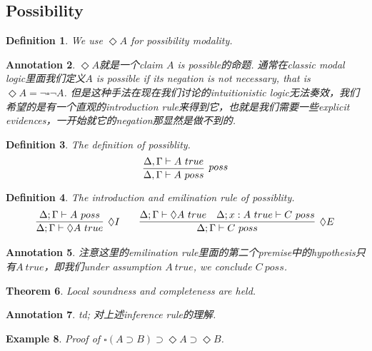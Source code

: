 \documentclass{article}
\theoremstyle{plain}
\newtheorem{theorem}{Theorem}
\newtheorem{example}[theorem]{Example}
\newtheorem{definition}[theorem]{Definition}
\newtheorem{annotation}[theorem]{Annotation}
\theoremstyle{nonumberplain}
\begin{document}
\newpage
\subsection{Possibility}

\begin{definition}
\rm We use $\Diamond A$ for possibility modality.
\end{definition}

\begin{annotation}
\rm $\Diamond A$就是一个claim $A$ is possible的命题. 通常在classic modal logic里面我们定义$A$ is possible if its negation is not necessary, that is $\Diamond A = \neg \square \neg A$. 但是这种手法在现在我们讨论的intuitionistic logic无法奏效，我们希望的是有一个直观的introduction rule来得到它，也就是我们需要一些explicit evidences，一开始就它的negation那显然是做不到的. 
\end{annotation}

\begin{definition}
\rm \cite{15-816-ciom}The definition of possiblity.
$$
\infer[poss]{\Delta,\Gamma \vdash A~poss}{\Delta,\Gamma \vdash A~true}
$$
\end{definition}


\begin{definition}
\rm The introduction and emilination rule of possiblity.
$$
\begin{aligned}
\infer[\Diamond I]{\Delta;\Gamma \vdash \Diamond A~true}{\Delta;\Gamma \vdash A~poss} &&&&
\infer[\Diamond E]{\Delta;\Gamma \vdash C~poss}{\Delta;\Gamma \vdash \Diamond A~true & \Delta;x:A~true \vdash C~poss}
\end{aligned}
$$
\end{definition}

\begin{annotation}
\rm 注意这里的emilination rule里面的第二个premise中的hypothesis只有$A ~true$，即我们under assumption $A~true$, we conclude $C~poss$.
\end{annotation}

\begin{theorem}
\rm Local soundness and completeness are held. 
\end{theorem}

\begin{annotation}
\rm td; 对上述inference rule的理解. 
\end{annotation}

\begin{example}
\rm Proof of $\square(A \supset B) \supset \Diamond A \supset \Diamond B$.
\end{example}
\end{document}
